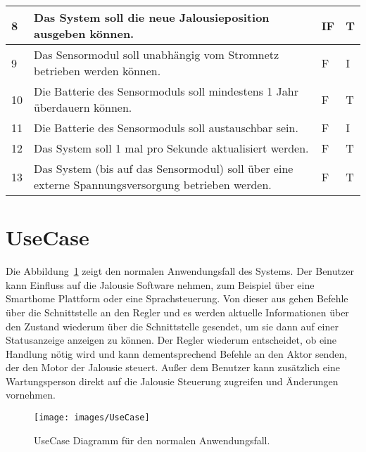 \begin{longtable}[ht]{p{}  p{} p{} p{}}
	8 & Das System soll die neue Jalousieposition ausgeben können. & IF & T \\* \midrule
	
	9 & Das Sensormodul soll unabhängig vom Stromnetz betrieben werden können. & F & I \\* \midrule
	
	10 & Die Batterie des Sensormoduls soll mindestens 1 Jahr überdauern können. & F & T \\* \midrule
	
	11 & Die Batterie des Sensormoduls soll austauschbar sein. & F & I \\* \midrule
	
	12 & Das System soll 1 mal pro Sekunde aktualisiert werden. & F & T \\* \midrule
	
	13 & Das System (bis auf das Sensormodul) soll über eine externe Spannungsversorgung betrieben werden. & F & T \\* \bottomrule
		
\end{longtable}

\section{UseCase}
Die Abbildung~\ref{fig:UseCase} zeigt den normalen Anwendungsfall des Systems. Der Benutzer kann Einfluss auf die Jalousie Software nehmen, zum Beispiel über eine Smarthome Plattform oder eine Sprachsteuerung. Von dieser aus gehen Befehle über die Schnittstelle an den Regler und es werden aktuelle Informationen über den Zustand wiederum über die Schnittstelle gesendet, um sie dann auf einer Statusanzeige anzeigen zu können. Der Regler wiederum entscheidet, ob eine Handlung nötig wird und kann dementsprechend Befehle an den Aktor senden, der den Motor der Jalousie steuert. Außer dem Benutzer kann zusätzlich eine Wartungsperson direkt auf die Jalousie Steuerung zugreifen und Änderungen vornehmen.
\begin{figure}[hbt]
	\centering
	\texttt{[image: images/UseCase]}
	\caption[UseCase Diagramm]{UseCase Diagramm für den normalen Anwendungsfall.}
	\label{fig:UseCase}
\end{figure}